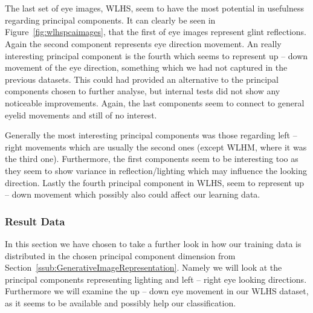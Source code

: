 \begin{minipage}{\linewidth}
{\begin{tabular}{ccccccc}
  \end{tabular}
  }
  \label{fig:wlhspcaimages}
  \end{minipage}\\\\

  The last set of eye images, WLHS, seem to have the most potential in usefulness regarding principal components. It can clearly be seen in Figure~\ref{fig:wlhspcaimages},
  that the first of eye images represent glint reflections. Again the second component represents eye direction movement. An really interesting principal component
  is the fourth which seems to represent up -- down movement of the eye direction, something which we had not captured in the previous datasets. This could
  had provided an alternative to the principal components chosen to further analyse, but internal tests did not show any noticeable improvements.
  Again, the last components seem to connect to general eyelid movements and still of no interest.

  Generally the most interesting principal components was those regarding left -- right movements which are usually the second ones (except WLHM, where it was the third one).
  Furthermore, the first components seem to be interesting too as they seem to show variance in reflection/lighting which may influence the looking direction.
  Lastly the fourth principal component in WLHS, seem to represent up -- down movement which possibly also could affect our learning data.

\subsubsection{Result Data}
\label{ssub:ResultData}
In this section we have chosen to take a further look in how our training data is distributed in the chosen principal component dimension from Section~\ref{ssub:GenerativeImageRepresentation}.
Namely we will look at the principal components representing lighting and left -- right eye looking directions. Furthermore we will examine the up -- down
eye movement in our WLHS dataset, as it seems to be available and possibly help our classification.\\

\begin{minipage}{\linewidth}
  \centering
  \label{fig:pca12plotnlhm}
\end{minipage}\\\\

